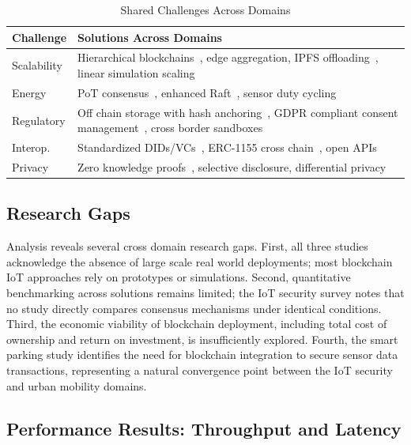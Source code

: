 \documentclass[conference]{IEEEtran}
\begin{document}
\begin{table}[htbp]
\caption{Shared Challenges Across Domains}
\begin{center}
\begin{tabular}{p{1.8cm}p{6cm}}
\toprule
\textbf{Challenge} & \textbf{Solutions Across Domains} \\
\midrule
Scalability & Hierarchical blockchains~\cite{b13}, edge aggregation, IPFS offloading~\cite{b17}, linear simulation scaling~\cite{b3} \\
\midrule
Energy & PoT consensus~\cite{b12}, enhanced Raft~\cite{b2}, sensor duty cycling~\cite{b3} \\
\midrule
Regulatory & Off chain storage with hash anchoring~\cite{b1}, GDPR compliant consent management~\cite{b18}, cross border sandboxes~\cite{b2} \\
\midrule
Interop. & Standardized DIDs/VCs~\cite{b11}, ERC-1155 cross chain~\cite{b17}, open APIs \\
\midrule
Privacy & Zero knowledge proofs~\cite{b19}, selective disclosure, differential privacy~\cite{b3} \\
\bottomrule
\end{tabular}
\label{tab:challenges}
\end{center}
\end{table}

\subsection{Research Gaps}

Analysis reveals several cross domain research gaps. First, all three studies acknowledge the absence of large scale real world deployments; most blockchain IoT approaches rely on prototypes or simulations. Second, quantitative benchmarking across solutions remains limited; the IoT security survey notes that no study directly compares consensus mechanisms under identical conditions. Third, the economic viability of blockchain deployment, including total cost of ownership and return on investment, is insufficiently explored. Fourth, the smart parking study identifies the need for blockchain integration to secure sensor data transactions, representing a natural convergence point between the IoT security and urban mobility domains.

\subsection{Performance Results: Throughput and Latency}
\end{document}
